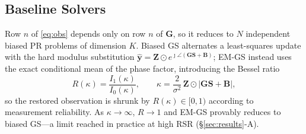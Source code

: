 \documentclass[conference]{IEEEtran}
\newcommand{\bG}{\mathbf{G}}
\newcommand{\bS}{\mathbf{S}}
\newcommand{\bB}{\mathbf{B}}
\newcommand{\bZ}{\mathbf{Z}}
\begin{document}
\subsection{Baseline Solvers}
Row $n$ of \eqref{eq:obs} depends only on row $n$ of $\bG$, so it reduces to
$N$ independent biased PR problems of dimension $K$. Biased GS \cite{cui2025}
alternates a least-squares update with the hard modulus substitution
$\hat{\mathbf{y}}=\bZ\odot e^{\jmath\angle(\bG\bS+\bB)}$; EM-GS instead uses
the exact conditional mean of the phase factor, introducing the Bessel ratio
\begin{equation}\label{eq:bessel}
R(\kappa)=\frac{I_1(\kappa)}{I_0(\kappa)},\qquad
\kappa=\frac{2}{\sigma^2}\,\bZ\odot\bigl|\bG\bS+\bB\bigr| ,
\end{equation}
so the restored observation is shrunk by $R(\kappa)\in[0,1)$ according to
measurement reliability. As $\kappa\to\infty$, $R\to1$ and EM-GS provably
reduces to biased GS---a limit reached in practice at high RSR
(\S\ref{sec:results}-A).

\end{document}
